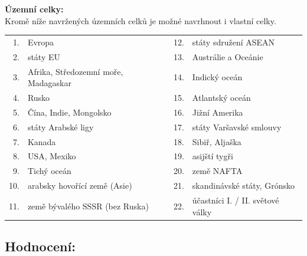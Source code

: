 \documentclass[12pt, a4paper]{article}
\begin{document}
\vspace{5mm}
\noindent \textbf{Územní celky:} \\
Kromě níže navržených územních celků je možné navrhnout i vlastní celky.

\vspace{3mm}
\begin{center}
\begin{tabular}{rlrl}
1. & Evropa & 12. & státy sdružení ASEAN \\
2. & státy EU & 13. & Austrálie a Oceánie \\
3. & Afrika, Středozemní moře, Madagaskar & 14. & Indický oceán \\
4. & Rusko & 15. & Atlantský oceán \\
5. & Čína, Indie, Mongolsko & 16. & Jižní Amerika \\
6. & státy Arabské ligy & 17. & státy Varšavské smlouvy \\
7. & Kanada & 18. & Sibiř, Aljaška \\
8. & USA, Mexiko & 19. & asijští tygři \\
9. & Tichý oceán & 20. & země NAFTA \\
10. & arabsky hovořící země (Asie) & 21. & skandinávské státy, Grónsko \\
11. & země bývalého SSSR (bez Ruska) & 22. & účastníci I. / II. světové války \\
\end{tabular}
\end{center}

\vspace{1cm}
\subsection*{\textbf{Hodnocení:}}
\end{document}
